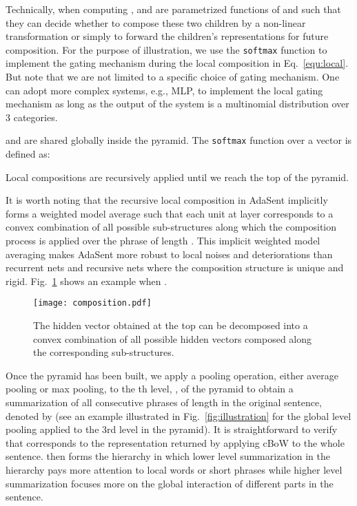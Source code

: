 \documentclass{article}
\theoremstyle{definition}
\begin{document}
Technically, when computing ,  and  are parametrized functions of  and  such that they can decide whether to compose these two children by a non-linear transformation or simply to forward the children's representations for future composition. For the purpose of illustration, we use the \texttt{softmax} function to implement the gating mechanism during the local composition in Eq.~\ref{equ:local}. But note that we are not limited to a specific choice of gating mechanism. One can adopt more complex systems, e.g., MLP, to implement the local gating mechanism as long as the output of the system is a multinomial distribution over 3 categories.

 and  are shared globally inside the pyramid. The \texttt{softmax} function over a vector is defined as:

Local compositions are recursively applied until we reach the top of the pyramid.

It is worth noting that the recursive local composition in AdaSent implicitly forms a weighted model average such that each unit at layer  corresponds to a convex combination of all possible sub-structures along which the composition process is applied over the phrase of length . This implicit weighted model averaging makes AdaSent more robust to local noises and deteriorations than recurrent nets and recursive nets where the composition structure is unique and rigid. Fig.~\ref{fig:composition} shows an example when . 
\begin{figure}[htb]
\centering
	\texttt{[image: composition.pdf]}
\caption{The hidden vector obtained at the top can be decomposed into a convex combination of all possible hidden vectors composed along the corresponding sub-structures.}
\label{fig:composition}
\end{figure}

Once the pyramid has been built, we apply a pooling operation, either average pooling or max pooling, to the th level, , of the pyramid to obtain a summarization of all consecutive phrases of length  in the original sentence, denoted by  (see an example illustrated in Fig.~\ref{fig:illustration} for the global level pooling applied to the 3rd level in the pyramid).
It is straightforward to verify that  corresponds to the representation returned by applying cBoW to the whole sentence.  then forms the hierarchy in which lower level summarization in the hierarchy pays more attention to local words or short phrases while higher level summarization focuses more on the global interaction of different parts in the sentence.
\end{document}
